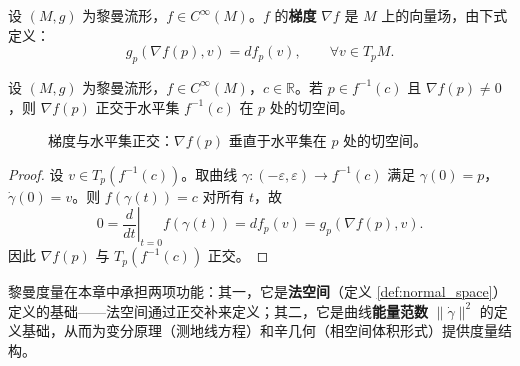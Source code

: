 \begin{definition}[黎曼度量下的梯度]\label{def:riemannian_gradient}
设 $(M, g)$ 为黎曼流形，$f \in C^\infty(M)$。$f$ 的\textbf{梯度} $\nabla f$ 是 $M$ 上的向量场，由下式定义：
\[
g_p(\nabla f(p), v) = df_p(v), \qquad \forall v \in T_pM.
\]
\end{definition}

\begin{proposition}[梯度与水平集的正交性]\label{prop:gradient_orthogonal_levelset}
设 $(M,g)$ 为黎曼流形，$f \in C^\infty(M)$，$c \in \mathbb{R}$。若 $p \in f^{-1}(c)$ 且 $\nabla f(p) \neq 0$，则 $\nabla f(p)$ 正交于水平集 $f^{-1}(c)$ 在 $p$ 处的切空间。
\end{proposition}

\begin{figure}[htbp]
\centering
{}
\caption{梯度与水平集正交：$\nabla f(p)$ 垂直于水平集在 $p$ 处的切空间。}
\label{fig:gradient_levelset}
\end{figure}

\begin{proof}
设 $v \in T_p(f^{-1}(c))$。取曲线 $\gamma: (-\varepsilon, \varepsilon) \to f^{-1}(c)$ 满足 $\gamma(0) = p$，$\dot{\gamma}(0) = v$。则 $f(\gamma(t)) = c$ 对所有 $t$，故
\[
0 = \left. \frac{d}{dt} \right|_{t=0} f(\gamma(t)) = df_p(v) = g_p(\nabla f(p), v).
\]
因此 $\nabla f(p)$ 与 $T_p(f^{-1}(c))$ 正交。
\end{proof}

\begin{remark}[黎曼度量的作用]\label{rem:riemannian_central}
黎曼度量在本章中承担两项功能：其一，它是\textbf{法空间}（定义 \ref{def:normal_space}）定义的基础——法空间通过正交补来定义；其二，它是曲线\textbf{能量范数} $\|\dot{\gamma}\|^2$ 的定义基础，从而为变分原理（测地线方程）和辛几何（相空间体积形式）提供度量结构。
\end{remark}

